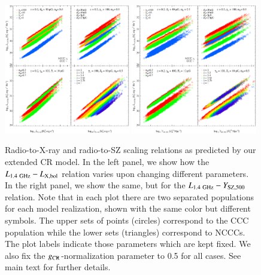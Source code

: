 \documentclass[useAMS,usenatbib]{mn2e}
\begin{document}
\begin{figure} 
\centering
\includegraphics[width=0.49\textwidth]{figures/PL_relation_testing_gimp.eps}
\includegraphics[width=0.49\textwidth]{figures/PSZ_relation_testing_gimp.eps}
\caption{Radio-to-X-ray and radio-to-SZ scaling relations as predicted by our
  extended CR model. In the left panel, we show how the
  $L_{1.4~{\mathrm{GHz}}}-L_{{\mathrm{X,bol}}}$ relation varies upon changing different
  parameters. In the right panel, we show the same, but for the
  $L_{1.4~{\mathrm{GHz}}}-Y_{{\mathrm{SZ}},500}$ relation. Note that in each plot there
  are two separated populations for each model realization, shown with the same
  color but different symbols. The upper sets of points (circles) correspond to
  the CCC population while the lower sets (triangles) correspond to NCCCs. The
  plot labels indicate those parameters which are kept fixed. We also fix the
  $g_{{\mathrm{CR}}}$-normalization parameter to 0.5 for all cases. See main text for
  further details.}
\label{fig:SR}
\end{figure}
\end{document}
